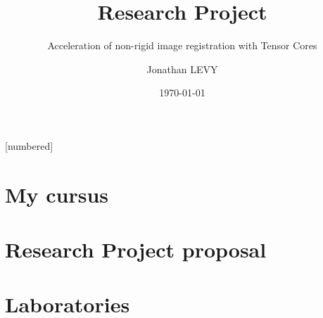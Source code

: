 \documentclass[11pt]{beamer}
\begin{document}
	\author{Jonathan LEVY}
	\title{Research Project}
	\subtitle{Acceleration of non-rigid image registration with Tensor Cores}
	\date{\today}
	[numbered]
	
	
	
	
	\section{My cursus}
	
	
	
	\section{Research Project proposal}
	
	
	
	
	
	
	
	
	\section{Laboratories}
	
	
	
	
	
	
	
	
\end{document}
